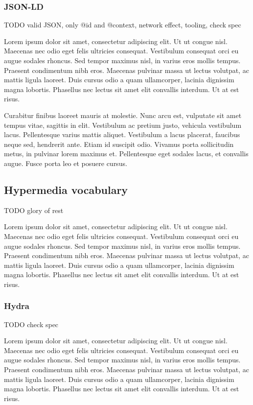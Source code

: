 \subsubsection{JSON-LD}\label{jsonld}

TODO valid JSON, only @id and @context, network effect, tooling, check spec

Lorem ipsum dolor sit amet, consectetur adipiscing elit. Ut ut congue nisl. Maecenas nec odio eget felis ultricies consequat. Vestibulum consequat orci eu augue sodales rhoncus. Sed tempor maximus nisl, in varius eros mollis tempus. Praesent condimentum nibh eros. Maecenas pulvinar massa ut lectus volutpat, ac mattis ligula laoreet. Duis cursus odio a quam ullamcorper, lacinia dignissim magna lobortis. Phasellus nec lectus sit amet elit convallis interdum. Ut at est risus.

Curabitur finibus laoreet mauris at molestie. Nunc arcu est, vulputate sit amet tempus vitae, sagittis in elit. Vestibulum ac pretium justo, vehicula vestibulum lacus. Pellentesque varius mattis aliquet. Vestibulum a lacus placerat, faucibus neque sed, hendrerit ante. Etiam id suscipit odio. Vivamus porta sollicitudin metus, in pulvinar lorem maximus et. Pellentesque eget sodales lacus, et convallis augue. Fusce porta leo et posuere cursus.

\subsection{Hypermedia vocabulary}

TODO glory of rest

Lorem ipsum dolor sit amet, consectetur adipiscing elit. Ut ut congue nisl. Maecenas nec odio eget felis ultricies consequat. Vestibulum consequat orci eu augue sodales rhoncus. Sed tempor maximus nisl, in varius eros mollis tempus. Praesent condimentum nibh eros. Maecenas pulvinar massa ut lectus volutpat, ac mattis ligula laoreet. Duis cursus odio a quam ullamcorper, lacinia dignissim magna lobortis. Phasellus nec lectus sit amet elit convallis interdum. Ut at est risus.

\subsubsection{Hydra}

TODO check spec

Lorem ipsum dolor sit amet, consectetur adipiscing elit. Ut ut congue nisl. Maecenas nec odio eget felis ultricies consequat. Vestibulum consequat orci eu augue sodales rhoncus. Sed tempor maximus nisl, in varius eros mollis tempus. Praesent condimentum nibh eros. Maecenas pulvinar massa ut lectus volutpat, ac mattis ligula laoreet. Duis cursus odio a quam ullamcorper, lacinia dignissim magna lobortis. Phasellus nec lectus sit amet elit convallis interdum. Ut at est risus.

